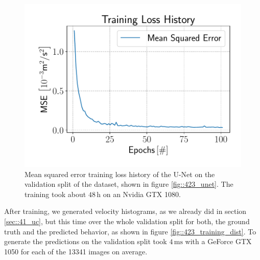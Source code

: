 \begin{figure}[h!]
	\centering
	\includegraphics[scale=.4]{chapters/04_experiments/02_autonomous_walking/05_07_19_loss_history.pdf}
	\caption{Mean squared error training loss history of the U-Net on the validation split of the dataset, shown in figure \ref{fig::423_unet}. The training took about $48\,\text{h}$ on an Nvidia GTX 1080.}
	\label{fig::423_loss}
\end{figure}
After training, we generated velocity histograms, as we already did in section \ref{sec::41_uc}, but this time over the whole validation split for both, the ground truth and the predicted behavior, as shown in figure \ref{fig::423_training_dist}. To generate the predictions on the validation split took $4\,\text{ms}$ with a GeForce GTX 1050 for each of the 13341 images on average.
